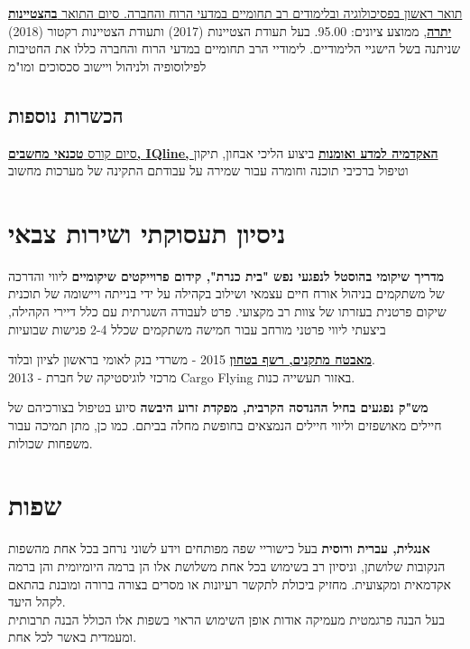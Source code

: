 {\href{https://www.dropbox.com/s/pcm0mybvgi85ma0/BA-Psych.pdf}{תואר ראשון בפסיכולוגיה ובלימודים רב תחומיים במדעי הרוח והחברה. סיום התואר \textbf{בהצטיינות יתרה}}, ממוצע ציונים: 95.00.}
{בעל תעודת הצטיינות (2017) ותעודת הצטיינות רקטור (2018) שניתנה בשל הישגיי הלימודיים.}
{לימודיי הרב תחומיים במדעי הרוח והחברה כללו את החטיבות לפילוסופיה ולניהול ויישוב סכסוכים ומו"מ}

\subsection{הכשרות נוספות}

{\href{https://www.dropbox.com/s/csphxdynjdg3ze2/computer-technitian-certificate.jpg?dl=0}{סיום קורס 
		\textbf{טכנאי מחשבים, IQline, האקדמיה למדע ואומנות}}}
{ביצוע הליכי אבחון, תיקון וטיפול ברכיבי תוכנה וחומרה עבור שמירה על עבודתם התקינה של מערכות מחשוב}
{}

\section{ניסיון תעסוקתי ושירות צבאי}

{\textbf{מדריך שיקומי בהוסטל לנפגעי נפש "בית כנרת", קידום פרוייקטים שיקומיים}}
{ליווי והדרכה של משתקמים בניהול אורח חיים עצמאי ושילוב בקהילה על ידי בנייתה ויישומה של תוכנית שיקום פרטנית בעזרתו של צוות רב מקצועי. פרט לעבודה השגרתית עם כלל דיירי הקהילה, ביצעתי ליווי פרטני מורחב עבור חמישה משתקמים שכלל 2-4 פגישות שבועיות}
{}

{\href{https://www.dropbox.com/s/kr5rcui1zgp35i0/recommendation-letter-security-guard.jpg?dl=0}{\textbf{מאבטח מתקנים, רשף בטחון}}} 
{2015 - משרדי בנק לאומי בראשון לציון ובלוד. 
	\\		
	2013 - מרכזי לוגיסטיקה של חברת Cargo Flying באזור תעשייה כנות.}
{}

{\textbf{מש"ק נפגעים בחיל ההנדסה הקרבית, מפקדת זרוע היבשה}}
{סיוע בטיפול בצורכיהם של חיילים מאושפזים וליווי חיילים הנמצאים בחופשת מחלה בביתם. כמו כן, מתן תמיכה עבור משפחות שכולות.}
{}

\section{שפות}

{\textbf{אנגלית, עברית ורוסית}}
{בעל כישוריי שפה מפותחים וידע לשוני נרחב בכל אחת מהשפות הנקובות 
	שלושתן, וניסיון רב בשימוש בכל אחת משלושת אלו הן ברמה היומיומית והן ברמה אקדמאית ומקצועית. מחזיק ביכולת לתקשר רעיונות או מסרים בצורה ברורה ומובנת בהתאם לקהל היעד. \\
	בעל הבנה פרגמטית מעמיקה אודות אופן השימוש הראוי בשפות אלו הכולל הבנה תרבותית ומעמדית באשר לכל אחת.} 
{}

